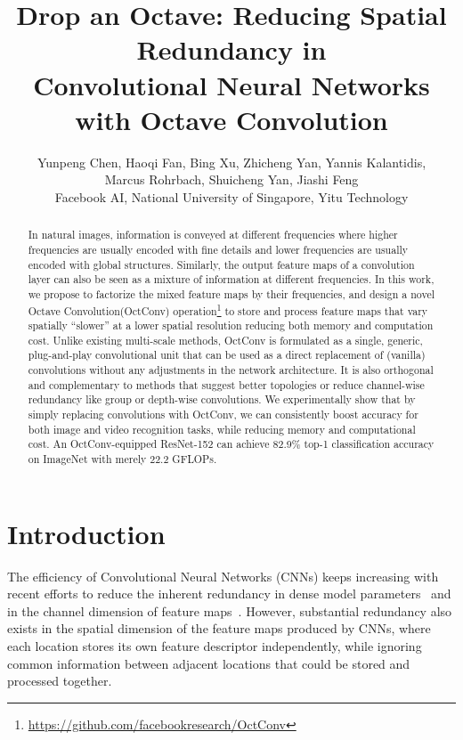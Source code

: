 \documentclass[10pt,twocolumn,letterpaper]{article}
\newcommand{\hiConv}[0]{OctConv\xspace}
\newcommand{\hiConvName}[0]{Octave Convolution\xspace}
\begin{document}
\title{Drop an Octave: Reducing Spatial Redundancy in \\ Convolutional Neural Networks with \hiConvName}

\author{
  Yunpeng Chen, Haoqi Fan, Bing Xu, Zhicheng Yan, Yannis Kalantidis, \\
  Marcus Rohrbach, Shuicheng Yan, Jiashi Feng \\
  Facebook AI, National University of Singapore, Yitu Technology \\
}



\maketitle



\begin{abstract}
In natural images, information is conveyed at different frequencies where higher frequencies are usually encoded with fine details and lower frequencies are usually encoded with global structures. Similarly, the output feature maps of a convolution layer can also be seen as a mixture of information at different frequencies. 
In this work, we propose to factorize the mixed feature maps by their frequencies, and design a novel \hiConvName (\hiConv) operation\footnote{\url{https://github.com/facebookresearch/OctConv}} to store and process feature maps that vary spatially ``slower'' at a lower spatial resolution reducing both memory and computation cost. Unlike existing multi-scale methods, \hiConv is formulated as a single, generic, plug-and-play convolutional unit that can be used as a direct replacement of (vanilla) convolutions without any adjustments in the network architecture. It is also orthogonal and complementary to methods that suggest better topologies or reduce channel-wise redundancy like group or depth-wise convolutions.
We experimentally show that by simply replacing convolutions with \hiConv, we can consistently boost accuracy for both image and video recognition tasks, while reducing memory and computational cost. An \hiConv-equipped ResNet-152 can achieve 82.9\% top-1 classification accuracy on ImageNet with merely 22.2 GFLOPs.
\end{abstract} 

\section{Introduction}

The efficiency of Convolutional Neural Networks (CNNs) keeps increasing with recent efforts to reduce the inherent redundancy in dense model parameters~\cite{DSD, ThiNet,ClipQ} and in the channel dimension of feature maps~\cite{ResNeXt,MobileNetV1,multifiber,xception}. However, substantial redundancy also exists in the spatial dimension of the feature maps produced by CNNs, where each location stores its own feature descriptor independently, while ignoring common information between adjacent locations that could be stored and processed together.
\end{document}
